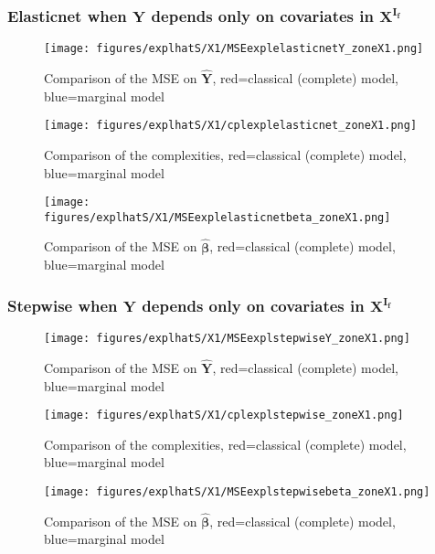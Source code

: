 \documentclass[12pt,a4paper]{report}
\begin{document}
\subsubsection{Elasticnet when $\boldsymbol{Y}$ depends only on covariates in $\boldsymbol{X^{I_f}}$}

	\begin{figure}[h!]
	\centering
		  \texttt{[image: figures/explhatS/X1/MSEexplelasticnetY\_zoneX1.png]}
		\caption{Comparison of the MSE on $\hat{\boldsymbol{Y}}$, red=classical (complete) model, blue=marginal model}\label{MSEexplelasticnetY_zoneX1}
	\end{figure}
	\begin{figure}[h!]
	\centering
		  \texttt{[image: figures/explhatS/X1/cplexplelasticnet\_zoneX1.png]}
		\caption{Comparison of the complexities, red=classical (complete) model, blue=marginal model}\label{cplexplelasticnet_zoneX1}
	\end{figure}
	\begin{figure}[h!]
	\centering
		  \texttt{[image: figures/explhatS/X1/MSEexplelasticnetbeta\_zoneX1.png]}
		\caption{Comparison of the MSE on $\hat{\boldsymbol{\beta}}$, red=classical (complete) model, blue=marginal model}\label{MSEexplelasticnetbeta_zoneX1}
	\end{figure}
	\FloatBarrier
\newpage
\subsubsection{Stepwise when $\boldsymbol{Y}$ depends only on covariates in $\boldsymbol{X^{I_f}}$}

	\begin{figure}[h!]
	\centering
		  \texttt{[image: figures/explhatS/X1/MSEexplstepwiseY\_zoneX1.png]}
		\caption{Comparison of the MSE on $\hat{\boldsymbol{Y}}$, red=classical (complete) model, blue=marginal model}\label{MSEexplstepwiseY_zoneX1}
	\end{figure}
	\begin{figure}[h!]
	\centering
		  \texttt{[image: figures/explhatS/X1/cplexplstepwise\_zoneX1.png]}
		\caption{Comparison of the complexities, red=classical (complete) model, blue=marginal model}\label{cplexplstepwise_zoneX1}
	\end{figure}
	\begin{figure}[h!]
	\centering
		  \texttt{[image: figures/explhatS/X1/MSEexplstepwisebeta\_zoneX1.png]}
		\caption{Comparison of the MSE on $\hat{\boldsymbol{\beta}}$, red=classical (complete) model, blue=marginal model}\label{MSEexplstepwisebeta_zoneX1}
	\end{figure}
	\FloatBarrier
\newpage
\end{document}
